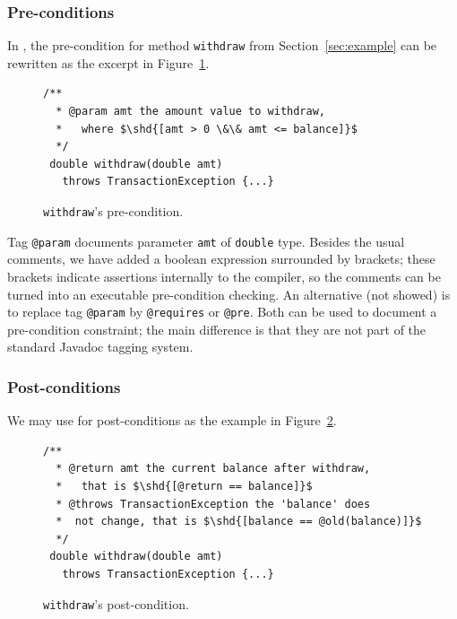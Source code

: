 \subsubsection{Pre-conditions}
In \contractjdoc, the pre-condition for method \lstinline!withdraw! from Section~\ref{sec:example} can be rewritten as the excerpt in Figure~\ref{fig:pre-example}.

\begin{figure}
\centering
\begin{lstlisting}[basicstyle=\footnotesize\ttfamily,name=figxpi, frame=lines, mathescape=true]
 /**
  * @param amt the amount value to withdraw, 
  *   where $\shd{[amt > 0 \&\& amt <= balance]}$
  */
 double withdraw(double amt) 
   throws TransactionException {...}
\end{lstlisting}
\caption{\texttt{withdraw}'s pre-condition.}
\label{fig:pre-example}
\end{figure}

Tag \lstinline!@param! documents parameter \lstinline!amt! of \lstinline!double! type.
Besides the usual comments, we have added a boolean expression
surrounded by brackets; these brackets indicate assertions internally to the \contractjdoc{} compiler, so the comments can be turned into an executable pre-condition checking.
An alternative (not showed) is to replace tag \lstinline!@param! by \lstinline!@requires! or \lstinline!@pre!. Both can be used to document a pre-condition constraint; the main difference is that they are not part of the standard Javadoc tagging system.

\subsubsection{Post-conditions}

We may use \contractjdoc{} for post-conditions as the example in Figure~\ref{fig:post-example}.


\begin{figure}
\centering
\begin{lstlisting}[basicstyle=\footnotesize\ttfamily,name=figxpi, frame=lines, mathescape=true]
 /**
  * @return amt the current balance after withdraw,
  *   that is $\shd{[@return == balance]}$
  * @throws TransactionException the 'balance' does
  *  not change, that is $\shd{[balance == @old(balance)]}$
  */
 double withdraw(double amt) 
   throws TransactionException {...}
\end{lstlisting}
\caption{\texttt{withdraw}'s post-condition.}
\label{fig:post-example}
\end{figure}

